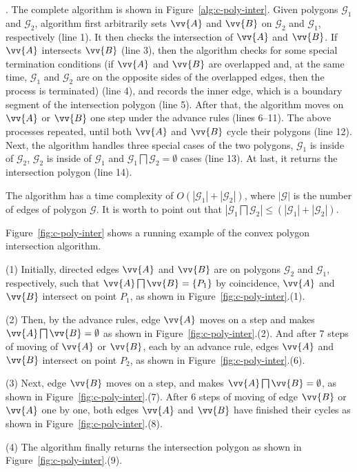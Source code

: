 . The complete algorithm is shown in Figure~\ref{alg:c-poly-inter}.
Given polygons $\mathcal{G}_1$ and $\mathcal{G}_2$, algorithm \cpia first arbitrarily sets $\vv{A}$ and $\vv{B}$ on $\mathcal{G}_2$ and $\mathcal{G}_1$, respectively (line 1).
%
It then checks the intersection of $\vv{A}$ and $\vv{B}$. If $\vv{A}$ intersects $\vv{B}$ (line 3), then the algorithm checks for some special termination conditions (\eg if $\vv{A}$ and $\vv{B}$ are overlapped and, at the same time, $\mathcal{G}_1$ and $\mathcal{G}_2$ are on the opposite sides of the overlapped edges, then the process is terminated) (line 4), and records the inner edge, which is a boundary segment of the intersection polygon (line 5).
After that, the algorithm moves on $\vv{A}$ or $\vv{B}$ one step under the advance rules (lines 6--11).
The above processes repeated, until both $\vv{A}$ and $\vv{B}$ cycle their polygons (line 12).
%
Next, the algorithm handles three special cases of the two polygons, \ie $\mathcal{G}_1$ is inside of $\mathcal{G}_2$, $\mathcal{G}_2$ is inside of $\mathcal{G}_1$ and $\mathcal{G}_1 \bigsqcap \mathcal{G}_2 = \emptyset$ cases (line 13).
%
At last, it returns the intersection polygon (line 14).

The algorithm has a time complexity of $O(|\mathcal{G}_1| + |\mathcal{G}_2|)$, where $|\mathcal{G}|$ is the number of edges of polygon $\mathcal{G}$.
It is worth to point out that $|\mathcal{G}_1 \bigsqcap \mathcal{G}_2| \le (|\mathcal{G}_1| + |\mathcal{G}_2|)$.



\begin{example}
Figure~\ref{fig:c-poly-inter} shows a running example of the convex polygon intersection algorithm.

\sstab(1) Initially, directed edges $\vv{A}$ and $\vv{B}$ are on polygons $\mathcal{G}_2$ and $\mathcal{G}_1$, respectively, such that $\vv{A} \bigsqcap \vv{B} = \{P_1\}$ by coincidence, \ie $\vv{A}$ and $\vv{B}$ intersect on point $P_1$, as shown in Figure~\ref{fig:c-poly-inter}.(1).

\sstab(2) Then, by the advance rules, edge $\vv{A}$ moves on a step and makes $\vv{A} \bigsqcap \vv{B} = \emptyset$ as shown in Figure~\ref{fig:c-poly-inter}.(2).
And after 7 steps of moving of $\vv{A}$ or $\vv{B}$, each by an advance rule, edges $\vv{A}$ and $\vv{B}$ intersect on point $P_2$, as shown in Figure~\ref{fig:c-poly-inter}.(6).

\sstab(3) Next, edge $\vv{B}$ moves on a step, and makes $\vv{A} \bigsqcap \vv{B} = \emptyset$, as shown in Figure~\ref{fig:c-poly-inter}.(7).
After 6 steps of moving of edge $\vv{B}$ or $\vv{A}$ one by one, both edges $\vv{A}$ and $\vv{B}$ have finished their cycles as shown in Figure~\ref{fig:c-poly-inter}.(8).

\sstab(4) The algorithm finally returns the intersection polygon as shown in Figure~\ref{fig:c-poly-inter}.(9).
\end{example}



